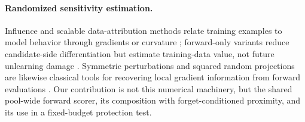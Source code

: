 \paragraph{Randomized sensitivity estimation.}
Influence and scalable data-attribution methods relate training examples to
model behavior through gradients or curvature
\cite{koh2017influence,park2023trak,kwon2024datainf}; forward-only variants
reduce candidate-side differentiation but estimate training-data value, not
future unlearning damage \cite{ko2024mirrored,deng2026forvalue}.
Symmetric perturbations and squared random projections are likewise
classical tools for recovering local gradient information from forward
evaluations \cite{spall1992spsa,malladi2023mezo,
hutchinson1989stochastic}. Our contribution is not this numerical machinery,
but the shared pool-wide forward scorer, its composition with
forget-conditioned proximity, and its use in a fixed-budget protection test.
